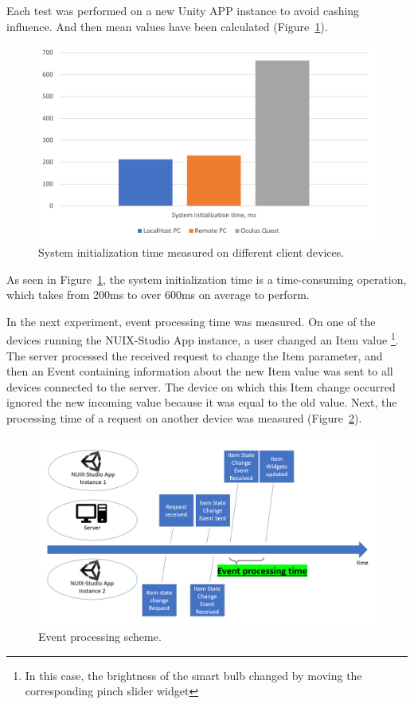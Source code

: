 Each test was performed on a new Unity APP instance to avoid cashing influence. And then mean values have been calculated (Figure~\ref{fig:SystemInitTime-figure}).

\begin{figure}
  \centering
  \includegraphics[width=0.9\linewidth]{figures/SystemInitTime.png}
  \caption{System initialization time measured on different client devices.}
  \label{fig:SystemInitTime-figure}
\end{figure}

As seen in Figure~\ref{fig:SystemInitTime-figure}, the system initialization time is a time-consuming operation, which takes from 200ms to over 600ms on average to perform.

In the next experiment, event processing time was measured. On one of the devices running the NUIX-Studio App instance, a user changed an Item value \footnote{In this case, the brightness of the smart bulb changed by moving the corresponding pinch slider widget}. The server processed the received request to change the Item parameter, and then an Event containing information about the new Item value was sent to all devices connected to the server. The device on which this Item change occurred ignored the new incoming value because it was equal to the old value. Next, the processing time of a request on another device was measured (Figure~\ref{fig:EventProcessingScheme-figure}).

\begin{figure}
  \centering
  \includegraphics[width = 0.9 \linewidth]{figures/EventProcessingScheme.png}
  \caption{Event processing scheme.}
  \label{fig:EventProcessingScheme-figure}
\end{figure}

